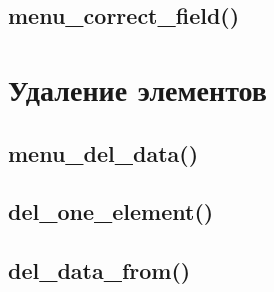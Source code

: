 \documentclass[12pt, a4paper]{article}
\begin{document}






\subsection{menu\_correct\_field()}







\section{Удаление элементов}



\subsection{menu\_del\_data()}






\subsection{del\_one\_element()}







\subsection{del\_data\_from()}
\end{document}
